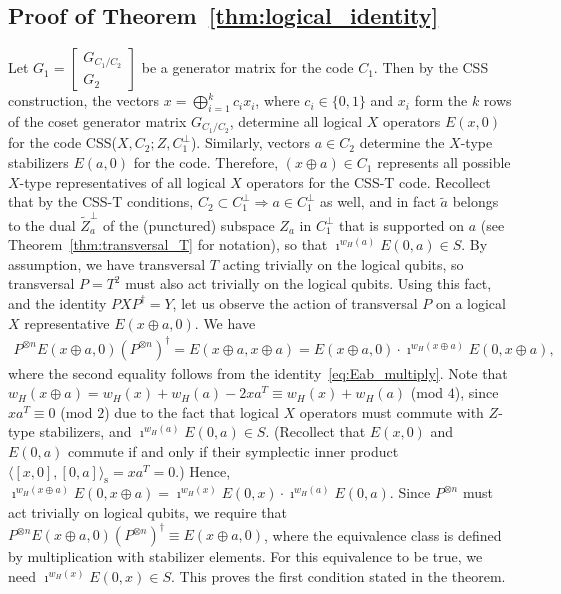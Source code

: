 \documentclass[twoside,romanappendices]{IEEEtran}
\newcommand{\syminn}[2]{\langle #1, #2 \rangle_{\text{s}}}
\begin{document}
\subsection{Proof of Theorem~\ref{thm:logical_identity}}
\label{sec:proof_logical_identity}



Let $G_1 = 
\begin{bmatrix}
G_{C_1/C_2} \\
G_2
\end{bmatrix}$ be a generator matrix for the code $C_1$.
Then by the CSS construction, the vectors $x = \bigoplus_{i = 1}^{k} c_i x_i$, where $c_i \in \{0,1\}$ and $x_i$ form the $k$ rows of the coset generator matrix $G_{C_1/C_2}$, determine all logical $X$ operators $E(x,0)$ for the code CSS($X, C_2; Z, C_1^{\perp}$).
Similarly, vectors $a \in C_2$ determine the $X$-type stabilizers $E(a,0)$ for the code. 
Therefore, $(x \oplus a) \in C_1$ represents all possible $X$-type representatives of all logical $X$ operators for the CSS-T code.
Recollect that by the CSS-T conditions, $C_2 \subset C_1^{\perp} \Rightarrow a \in C_1^{\perp}$ as well, and in fact $\tilde{a}$ belongs to the dual $\tilde{Z}_a^{\perp}$ of the (punctured) subspace $Z_a$ in $C_1^{\perp}$ that is supported on $a$ (see Theorem~\ref{thm:transversal_T} for notation), so that $\imath^{w_H(a)} E(0,a) \in S$.
By assumption, we have transversal $T$ acting trivially on the logical qubits, so transversal $P = T^2$ must also act trivially on the logical qubits.
Using this fact, and the identity $PXP^{\dagger} = Y$, let us observe the action of transversal $P$ on a logical $X$ representative $E(x \oplus a, 0)$.
We have
\begin{align}
P^{\otimes n} E(x \oplus a, 0) \left( P^{\otimes n} \right)^{\dagger} = E(x \oplus a, x \oplus a) = E(x \oplus a, 0) \cdot \imath^{w_H(x \oplus a)} E(0, x \oplus a),
\end{align}
where the second equality follows from the identity~\eqref{eq:Eab_multiply}.
Note that $w_H(x \oplus a) = w_H(x) + w_H(a) - 2 xa^T \equiv w_H(x) + w_H(a)$ (mod $4$), since $xa^T \equiv 0$ (mod $2$) due to the fact that logical $X$ operators must commute with $Z$-type stabilizers, and $\imath^{w_H(a)} E(0,a) \in S$.
(Recollect that $E(x,0)$ and $E(0,a)$ commute if and only if their symplectic inner product $\syminn{[x,0]}{[0,a]} = xa^T = 0$.)
Hence, $\imath^{w_H(x \oplus a)} E(0, x \oplus a) = \imath^{w_H(x)} E(0,x) \cdot \imath^{w_H(a)} E(0,a)$. 
Since $P^{\otimes n}$ must act trivially on logical qubits, we require that $P^{\otimes n} E(x \oplus a, 0) \left( P^{\otimes n} \right)^{\dagger} \equiv E(x \oplus a, 0)$, where the equivalence class is defined by multiplication with stabilizer elements.
For this equivalence to be true, we need $\imath^{w_H(x)} E(0,x) \in S$. 
This proves the first condition stated in the theorem.
\end{document}
